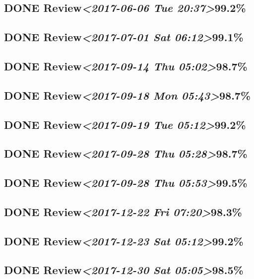 \documentclass[11pt]{ctexart}
\begin{document}
\subsection{{\bfseries\sffamily DONE} Review\textit{<2017-06-06 Tue 20:37>}99.2\%}
\label{sec:org23ccc04}
\subsection{{\bfseries\sffamily DONE} Review\textit{<2017-07-01 Sat 06:12>}99.1\%}
\label{sec:org575ce23}
\subsection{{\bfseries\sffamily DONE} Review\textit{<2017-09-14 Thu 05:02>}98.7\%}
\label{sec:orgdb4c7af}
\subsection{{\bfseries\sffamily DONE} Review\textit{<2017-09-18 Mon 05:43>}98.7\%}
\label{sec:orgb34fbf0}
\subsection{{\bfseries\sffamily DONE} Review\textit{<2017-09-19 Tue 05:12>}99.2\%}
\label{sec:org8968d09}
\subsection{{\bfseries\sffamily DONE} Review\textit{<2017-09-28 Thu 05:28>}98.7\%}
\label{sec:orgd1cc5f5}
\subsection{{\bfseries\sffamily DONE} Review\textit{<2017-09-28 Thu 05:53>}99.5\%}
\label{sec:org9ecfaaa}

\subsection{{\bfseries\sffamily DONE} Review\textit{<2017-12-22 Fri 07:20>}98.3\%}
\label{sec:org1155062}
\subsection{{\bfseries\sffamily DONE} Review\textit{<2017-12-23 Sat 05:12>}99.2\%}
\label{sec:orgc1d0cd3}
\subsection{{\bfseries\sffamily DONE} Review\textit{<2017-12-30 Sat 05:05>}98.5\%}
\label{sec:orgd6b8cc9}
\end{document}
